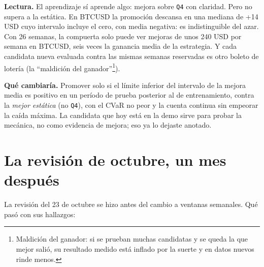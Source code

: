\documentclass[11pt,a4paper]{article}
\newcommand{\code}[1]{\texttt{\small #1}}
\begin{document}
\textbf{Lectura.} El aprendizaje sí aprende algo: mejora sobre \code{Q4} con claridad. Pero no supera a la
estática. En BTCUSD la promoción descansa en una mediana de +14 USD cuyo intervalo incluye el cero, con
media negativa: es indistinguible del azar. Con 26 semanas, la compuerta solo puede ver mejoras de unos 240
USD por semana en BTCUSD, seis veces la ganancia media de la estrategia. Y cada candidata nueva evaluada
contra las mismas semanas reservadas es otro boleto de lotería (la ``maldición del
ganador''\footnote{Maldición del ganador: si se prueban muchas candidatas y se queda la que mejor salió, su
resultado medido está inflado por la suerte y en datos nuevos rinde menos.}).

\textbf{Qué cambiaría.} Promover solo si el límite inferior del intervalo de la mejora media es positivo en
un período de prueba posterior al de entrenamiento, contra la \emph{mejor estática} (no \code{Q4}), con el
CVaR no peor y la cuenta continua sin empeorar la caída máxima. La candidata que hoy está en la demo sirve
para probar la mecánica, no como evidencia de mejora; eso ya lo dejaste anotado.

\section{La revisión de octubre, un mes después}

La revisión del 23 de octubre se hizo antes del cambio a ventanas semanales. Qué pasó con sus hallazgos:
\end{document}
